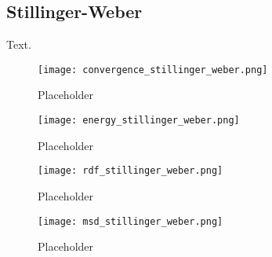 \subsection{Stillinger-Weber}
Text.

\begin{figure}[h]
    \centering
    \texttt{[image: convergence\_stillinger\_weber.png]}
    \caption{Placeholder}
    \label{fig:msd}
\end{figure}

\begin{figure}[h]
    \centering
    \texttt{[image: energy\_stillinger\_weber.png]}
    \caption{Placeholder}
    \label{fig:msd}
\end{figure}

\begin{figure}[h]
    \centering
    \texttt{[image: rdf\_stillinger\_weber.png]}
    \caption{Placeholder}
    \label{fig:msd}
\end{figure}

\begin{figure}[h]
    \centering
    \texttt{[image: msd\_stillinger\_weber.png]}
    \caption{Placeholder}
    \label{fig:msd}
\end{figure}
